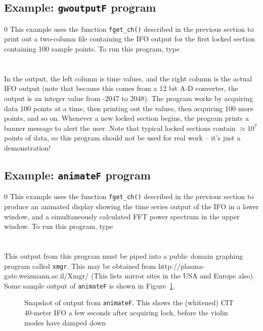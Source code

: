 \clearpage

\subsection{Example: {\tt gwoutputF} program}
\setcounter{equation}0
This example uses the function {\tt fget\_ch()} described in the
previous section to print out a two-column file containing the IFO
output for the first locked section containing 100 sample points. 
To run this program, type\\
\\
\\
In the output, the left column is time values, and the right column
is the actual IFO output (note that because this comes from a 12 bit
A-D converter, the output is an integer value from -2047 to 2048).
The program works by acquiring data 100 points at a time, then printing
out the values, then acquiring 100 more points, and so on.  Whenever a
new locked section begins, the program prints a banner message to alert
the user.  Note that typical locked sections contain $\approx 10^7$
points of data, so this program should not be used for real work --
it's just a demonstration!
\clearpage

\subsection{Example: {\tt animateF} program}
\label{s:animateF}
\setcounter{equation}0
This example uses the function {\tt fget\_ch()} described in the previous
section to produce an animated display showing the time series output
of the IFO in a lower window, and a simultaneously calculated FFT power
spectrum in the upper window. 
To run this program, type\\
\\
\\
This output from this program must be
piped into a public domain graphing program called {\tt xmgr}.  This may
be obtained from
{http://plasma-gate.weizmann.ac.il/Xmgr/}
(This lists mirror sites in the USA and Europe also).
Some sample output of {\tt animateF} is shown in Figure~\ref{f:animateF}.
\begin{figure}[h]
\begin{center}
\caption{ \label{f:animateF} Snapshot of output from {\tt animateF}.
This shows the (whitened) CIT 40-meter IFO a few seconds after acquiring
lock, before the violin modes have damped down }
\end{center}
\end{figure}

